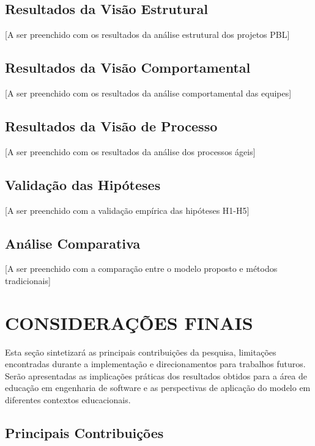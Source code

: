 \documentclass[12pt,a4paper]{article}
\begin{document}
\subsection{Resultados da Visão Estrutural}

[A ser preenchido com os resultados da análise estrutural dos projetos PBL]

\subsection{Resultados da Visão Comportamental}

[A ser preenchido com os resultados da análise comportamental das equipes]

\subsection{Resultados da Visão de Processo}

[A ser preenchido com os resultados da análise dos processos ágeis]

\subsection{Validação das Hipóteses}

[A ser preenchido com a validação empírica das hipóteses H1-H5]

\subsection{Análise Comparativa}

[A ser preenchido com a comparação entre o modelo proposto e métodos tradicionais]

\section{CONSIDERAÇÕES FINAIS}

Esta seção sintetizará as principais contribuições da pesquisa, limitações
encontradas durante a implementação e direcionamentos para trabalhos futuros.
Serão apresentadas as implicações práticas dos resultados obtidos para a área
de educação em engenharia de software e as perspectivas de aplicação do modelo
em diferentes contextos educacionais.

\subsection{Principais Contribuições}
\end{document}
